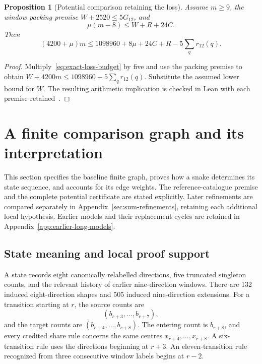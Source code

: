 \documentclass[11pt,a4paper]{article}
\newtheorem{proposition}[theorem]{Proposition}
\theoremstyle{definition}
\theoremstyle{remark}
\begin{document}
\begin{proposition}[Potential comparison retaining the loss]\label{prop:loss-potential}
Assume $m\ge9$, the window packing premise $W+2520\le5G_{12}$, and
\[
\mu(m-8)\le W+R+24C.
\]
Then
\begin{equation}\label{eq:retained-loss-potential}
(4200+\mu)m\le1098960+8\mu+24C+R-5\sum_qr_{12}(q).
\end{equation}
\end{proposition}
\begin{proof}
Multiply~\eqref{eq:exact-loss-budget} by five and use the packing premise
to obtain $W+4200m\le1098960-5\sum_qr_{12}(q)$.
Substitute the assumed lower bound for $W$. The resulting arithmetic
implication is checked in Lean with each premise retained~\cite{loss163archive}.
\end{proof}

\section{A finite comparison graph and its interpretation}\label{sec:current-model}
This section specifies the baseline finite graph, proves how a snake determines its state sequence, and accounts for its edge weights. The reference-catalogue premise and the complete potential certificate are stated explicitly. Later refinements are compared separately in Appendix~\ref{sec:sum-refinements}, retaining each additional local hypothesis. Earlier models and their replacement cycles are retained in Appendix~\ref{app:earlier-long-models}.

\subsection{State meaning and local proof support}
A state records eight canonically relabelled directions, five truncated singleton counts, and the relevant history of earlier nine-direction windows. There are 132 induced eight-direction shapes and 505 induced nine-direction extensions. For a transition starting at $r$, the source counts are
\[
(b_{r+3},\ldots,b_{r+7}),
\]
and the target counts are $(b_{r+4},\ldots,b_{r+8})$. The entering count is $b_{r+8}$, and every credited share rule concerns the same centres $x_{r+4},\ldots,x_{r+8}$. A six-transition rule uses the directions beginning at $r+3$. An eleven-transition rule recognized from three consecutive window labels begins at $r-2$.
\end{document}
